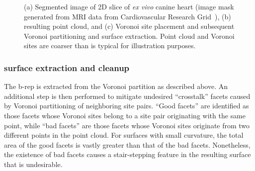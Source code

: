 \begin{figure}[htbp!]
{\label{fig:d2dvor2}}
%
\caption{(a) Segmented image of 2D slice of \textit{ex vivo} canine heart (image mask generated from MRI data from Cardiovascular Research Grid~\cite{cvgg}), (b) resulting point cloud, and (c) Voronoi site placement and subsequent Voronoi partitioning and surface extraction. Point cloud and Voronoi sites are coarser than is typical for illustration purposes.}
\label{fig:d2dvor}
\end{figure}

\subsubsection{surface extraction and cleanup}

The b-rep is extracted from the Voronoi partition as described above.  An additional step is then performed to mitigate undesired ``crosstalk'' facets caused by Voronoi partitioning of neighboring site pairs. ``Good facets'' are identified as those facets whose Voronoi sites belong to a site pair originating with the same point, while ``bad facets'' are those facets whose Voronoi sites originate from two different points in the point cloud. For surfaces with small curvature, the total area of the good facets is vastly greater than that of the bad facets.  Nonetheless, the existence of bad facets causes a stair-stepping feature in the resulting surface that is undesirable.

